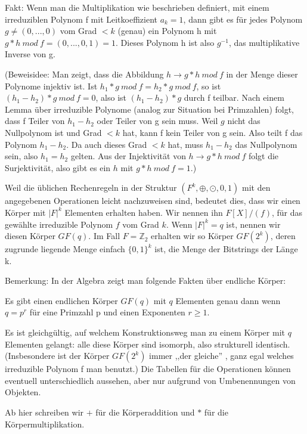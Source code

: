 \documentclass[a4paper]{article}
\begin{document}
\begin{multicols}{3}
    Fakt: Wenn man die Multiplikation wie beschrieben definiert, mit einem irreduziblen Polynom f mit Leitkoeffizient $a_k=1$, dann gibt es für jedes Polynom $g\not=(0,...,0)$ vom Grad $<k$ (genau) ein Polynom h mit $g*h\ mod\ f=(0,...,0,1)=1$. Dieses Polynom h ist also $g^{-1}$, das multiplikative Inverse von g.

    (Beweisidee: Man zeigt, dass die Abbildung $h\rightarrow g*h\ mod\ f$ in der Menge dieser Polynome injektiv ist. Ist $h_1*g\ mod\ f=h_2*g\ mod\ f$, so ist $(h_1-h_2)*g\ mod\ f= 0$, also ist $(h_1-h_2)*g$ durch f teilbar. Nach einem Lemma über irreduzible Polynome (analog zur Situation bei Primzahlen) folgt, dass f Teiler von $h_1-h_2$ oder Teiler von g sein muss. Weil $g$ nicht das Nullpolynom ist und Grad $<k$ hat, kann f kein Teiler von g sein. Also teilt f das Polynom $h_1-h_2$. Da auch dieses Grad $<k$ hat, muss $h_1-h_2$ das Nullpolynom sein, also $h_1=h_2$ gelten. Aus der Injektivität von $h\rightarrow g*h\ mod\ f$ folgt die Surjektivität, also gibt es ein $h$ mit $g*h\ mod\ f=1$.)

    Weil die üblichen Rechenregeln in der Struktur $(F^k,\oplus,\odot,0,1)$ mit den angegebenen Operationen leicht nachzuweisen sind, bedeutet dies, dass wir einen Körper mit $|F|^k$ Elementen erhalten haben. Wir nennen ihn $F[X]/(f)$, für das gewählte irreduzible Polynom $f$ vom Grad $k$. Wenn $|F|^k=q$ ist, nennen wir diesen Körper $GF(q)$. Im Fall $F=\mathbb{Z}_2$ erhalten wir so Körper $GF(2^k)$, deren zugrunde liegende Menge einfach $\{0,1\}^k$ ist, die Menge der Bitstrings der Länge k.

    Bemerkung: In der Algebra zeigt man folgende Fakten über endliche Körper:
    \begin{itemize*}
        \item Es gibt einen endlichen Körper $GF(q)$ mit $q$ Elementen genau dann wenn $q=p^r$ für eine Primzahl p und einen Exponenten $r\geq 1$.
        \item Es ist gleichgültig, auf welchem Konstruktionsweg man zu einem Körper mit $q$ Elementen gelangt: alle diese Körper sind isomorph, also strukturell identisch. (Insbesondere ist der Körper $GF(2^k)$ immer ,,der gleiche'' , ganz egal welches irreduzible Polynom f man benutzt.) Die Tabellen für die Operationen können eventuell unterschiedlich aussehen, aber nur aufgrund von Umbenennungen von Objekten.
    \end{itemize*}

    Ab hier schreiben wir $+$ für die Körperaddition und $*$ für die Körpermultiplikation.


\end{multicols}
\end{document}
